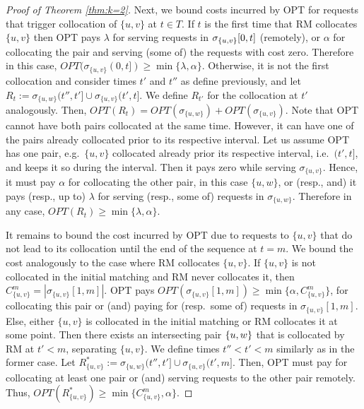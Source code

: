 \documentclass[a4paper,anonymous,USenglish]{lipics-v2019}
\newcommand{\OPT}{\textsf{OPT}\xspace}
\newcommand{\OPTM}{\mathit{OPT}}
\newcommand{\RM}{\textsf{RM}\xspace} %
\DeclarePairedDelimiter\set{\{}{\}}
\begin{document}
\begin{proof}[Proof of Theorem \ref{thm:k=2}]
	Next,
	we bound  costs incurred by \OPT for requests that trigger collocation of $\{u,v\}$ at $t \in T$.
	If $t$ is the first time that \RM collocates $\{u,v\}$ then  \OPT pays
	$\lambda$ for serving requests in $\sigma_{\set{u,v}}[0,t]$ (remotely),
	or $\alpha$ for collocating the pair and
	serving (some of) the requests with  cost zero.
	Therefore in this case,
	$\OPTM (\sigma_{\{u,v\}}(0,t]) \geq  \min{\{ \lambda,\alpha \}}$.
	Otherwise,
	it is not the first collocation and
	consider times $t'$ and $t''$ as define previously,
	 and let 
	$R_t := \sigma_{\{u,w\}}(t'',t'] \cup \sigma_{\{u,v\}}(t',t] $.
	We define $R_{t'}$ for the collocation at $t'$  analogously.
	Then,
	$\OPTM(R_t) = \mathit{OPT} (\sigma_{\{u,w\}}) 
	+ \OPTM(\sigma_{\{u,v\}}) $.
	Note that \OPT cannot have both pairs collocated at the same time.
	However, it can have one of the pairs already collocated prior to its respective interval.
	Let us assume  \OPT has one pair,
	e.g.~$\{u,v\}$ collocated already prior its respective interval, i.e.~$(t',t]$,
	 and keeps it so during the interval.
	 Then it pays zero while serving $\sigma_{\{u,v\}}$.
	Hence,
	it must pay $\alpha$ for collocating the other pair, in this case $\{u,w\}$,
	or (resp., and) it pays (resp., up to) $\lambda$ for serving (resp., some of) requests in $\sigma_{\{u,w\}}$. 
	Therefore in any case,
	$\OPTM(R_t) \geq  \min{\{ \lambda,\alpha \}}$.
	
	It remains to bound the cost  incurred by \OPT due to requests to $\{u,v\}$ that do not lead to its collocation until the end of the sequence at $t=m$.
	We bound the cost analogously to the case where \RM collocates $\{u,v\}$.
	If $\{u,v\}$ is not collocated in the initial matching
	and \RM never collocates it,
	then $ C^{m}_{ \{u,v\} } =| \sigma_{\{u,v\}}[1,m] |$.
	\OPT pays
	$\mathit{OPT} (\sigma_{\{u,v\}}[1,m]) 
	\geq \min{ \{ \alpha, C^{m}_{ \{u,v\} } \} }$,
	for collocating this pair or (and) paying for (resp.~some of) requests in $\sigma_{\{u,v\}}[1,m]$.
	Else,
	either $\{u,v\}$ is collocated in the initial matching
	or \RM collocates it at some point.
	Then there exists an intersecting pair $\set{u,w}$
	that is collocated by \RM at $t' < m$,
	separating $\{u,v\}$.
	We define times $t'' < t' < m$ similarly as in the former case.
	Let $R^*_{\{u,v\}} := \sigma_{\{u,w\}} (t'',t'] \cup \sigma_{\{u,v\}} (t',m]$.
	Then,
	\OPT must pay for collocating at least one pair or (and) serving requests 
	to the other pair remotely.
	Thus,
	$\mathit{OPT} (R^*_{\{u,v\}}) 
	\geq  \min{ \{ C^{m}_{ \{u,v\}}, \alpha \}}$.
	

\end{proof}
\end{document}

